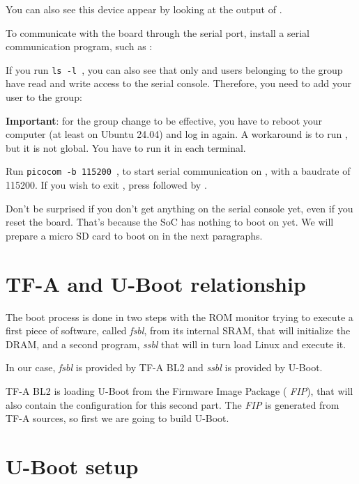 You can also see this device appear by looking at the output of
.

To communicate with the board through the serial port, install a
serial communication program, such as :


If you run {\tt ls -l \hosttty}, you can also see that only
 and users belonging to the  group have
read and write access to the serial console. Therefore, you need
to add your user to the  group:


{\bf Important}: for the group change to be effective, you have to
reboot your computer (at least on Ubuntu 24.04) and log in again.
A workaround is to run , but it is not global.
You have to run it in each terminal.

Run {\tt picocom -b 115200 \hosttty}, to start serial
communication on {\tt \hosttty}, with a baudrate of 115200.
If you wish to exit , press \code{[Ctrl][a]} followed by
\code{[Ctrl][x]}.

Don't be surprised if you don't get anything on the serial console yet,
even if you reset the board. That's because the SoC has nothing to boot
on yet. We will prepare a micro SD card to boot on in the next paragraphs.

\section{TF-A and U-Boot relationship}

The boot process is done in two steps with the ROM monitor trying to
execute a first piece of software, called {\em fsbl}, from its
internal SRAM, that will initialize the DRAM, and a second program,
{\em ssbl} that will in turn load Linux and execute it.

In our case, {\em fsbl} is provided by TF-A BL2 and {\em
  ssbl} is provided by U-Boot.

TF-A BL2 is loading U-Boot from the Firmware Image Package ({\em
  FIP}), that will also contain the configuration for this second
part. The {\em FIP} is generated from TF-A sources, so first we are
going to build U-Boot.

\section{U-Boot setup}

